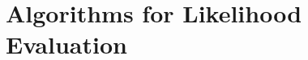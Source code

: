 \documentclass{article}
\begin{document}

\section{Algorithms for Likelihood Evaluation} \label{sec:algorithms}
\end{document}
